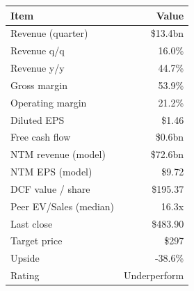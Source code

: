 \begin{tabular}{@{}lr@{}}
\toprule
Item & Value \\
\midrule
Revenue (quarter) & \$13.4bn \\
Revenue q/q & 16.0\% \\
Revenue y/y & 44.7\% \\
Gross margin & 53.9\% \\
Operating margin & 21.2\% \\
Diluted EPS & \$1.46 \\
Free cash flow & \$0.6bn \\
\midrule
NTM revenue (model) & \$72.6bn \\
NTM EPS (model) & \$9.72 \\
DCF value / share & \$195.37 \\
Peer EV/Sales (median) & 16.3x \\
Last close & \$483.90 \\
Target price & \$297 \\
Upside & -38.6\% \\
Rating & Underperform \\
\bottomrule
\end{tabular}
